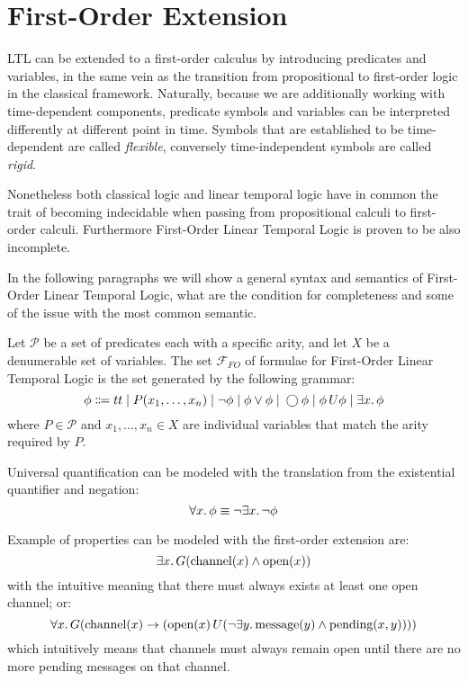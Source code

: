 \section{First-Order Extension}

LTL can be extended to a first-order calculus by introducing predicates and variables, in the same vein as the
transition from propositional to first-order logic in the classical framework. Naturally, because we are additionally
working with time-dependent components, predicate symbols and variables can be interpreted differently at different
point in time. Symbols that are established to be time-dependent are called \emph{flexible}, conversely time-independent
symbols are called \emph{rigid}.

Nonetheless both classical logic and linear temporal logic have in common the trait of becoming indecidable when passing
from propositional calculi to first-order calculi. Furthermore First-Order Linear Temporal Logic is proven to be also
incomplete.

In the following paragraphs we will show a general syntax and semantics of First-Order Linear Temporal Logic, what are
the condition for completeness and some of the issue with the most common semantic.

\begin{definition}\label{def:kripkefoltlsyn}
  Let $\mathcal{P}$ be a set of predicates each with a specific arity, and let $X$ be a denumerable set of variables.
  The set $\mathcal{F}_{FO}$ of formulae for First-Order Linear Temporal Logic is the set generated by the following grammar:
  \[
    \phi \Coloneqq tt \;|\; P(x_1, \ldots, x_n)
                      \;|\; \neg\phi
                      \;|\; \phi \lor \phi
                      \;|\; \bigcirc{\phi}
                      \;|\; {\phi}\,U {\phi}
                      \;|\; \exists {x} \ldotp {\phi}
  \]
  where $P \in \mathcal{P}$ and $x_1, \ldots, x_n \in X$ are individual variables that match the arity required by $P$.
\end{definition}
Universal quantification can be modeled with the translation from the existential quantifier and negation:
\[
  \forall {x} \ldotp {\phi} \equiv \neg\exists {x} \ldotp {\neg\phi}
\]

Example of properties can be modeled with the first-order extension are:
\[
  \exists {x} \ldotp {G(\text{channel}(x) \land \text{open}(x))}
\]
with the intuitive meaning that there must always exists at least one open channel; or:
\[
  \forall {x} \ldotp {G(\text{channel}(x) \to ({\text{open}(x)}\,U {(\neg\exists {y} \ldotp {\text{message}(y) \land \text{pending}(x, y)})}))}
\]
which intuitively means that channels must always remain open until there are no more pending messages on that channel.

